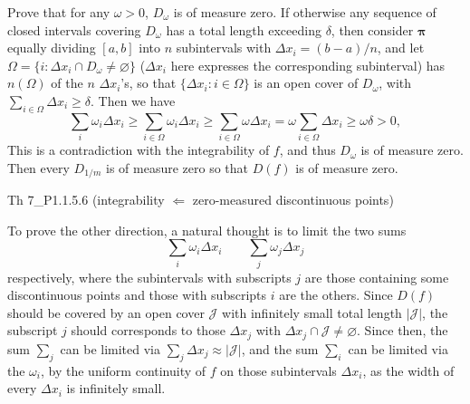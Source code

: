 \documentclass{article}
\begin{document}
Prove that for any $\omega>0$, $D_{\omega}$ is of measure zero. If otherwise any sequence of closed intervals covering $D_{\omega}$ has a total length exceeding $\delta$, then consider $\pmb{\pi}$ equally dividing $[a,b]$ into $n$ subintervals with $\Delta x_i = (b-a)/n$, and let $\Omega = \{i: \Delta x_i\cap D_{\omega}\neq\varnothing\}$ ($\Delta x_i$ here expresses the corresponding subinterval) has $n(\Omega)$ of the $n$ $\Delta x_i$'s, so that $\{\Delta x_i: i\in\Omega\}$ is an open cover of $D_{\omega}$, with $\sum_{i\in\Omega} \Delta x_i \geq \delta$. Then we have
$$ \sum_{i} \omega_i\Delta x_i \geq \sum_{i\in\Omega} \omega_i\Delta x_i \geq \sum_{i\in\Omega} \omega\Delta x_i = \omega \sum_{i\in\Omega} \Delta x_i \geq \omega \delta > 0, $$
This is a contradiction with the integrability of $f$, and thus $D_{\omega}$ is of measure zero. Then every $D_{1/m}$ is of measure zero so that $D(f)$ is of measure zero. 

\begin{Th}{Th 7\_P1.1.5.6 (integrability $\Leftarrow$ zero-measured discontinuous points)}
\end{Th}

To prove the other direction, a natural thought is to limit the two sums 
$$ \sum_{i} \omega_i\Delta x_i \qquad \sum_{j} \omega_j\Delta x_j $$
respectively, where the subintervals with subscripts $j$ are those containing some discontinuous points and those with subscripts $i$ are the others. Since $D(f)$ should be covered by an open cover $\mathcal{J}$ with infinitely small total length $|\mathcal{J}|$, the subscript $j$ should corresponds to those $\Delta x_j$ with $\Delta x_j \cap \mathcal{J} \neq\varnothing $. Since then, the sum $\sum_{j}$ can be limited via $\sum_{j} \Delta x_j \approx |\mathcal{J}|$, and the sum $\sum_{i}$ can be limited via the $\omega_i$, by the uniform continuity of $f$ on those subintervals $\Delta x_i$, as the width of every $\Delta x_i$ is infinitely small. 
\end{document}

